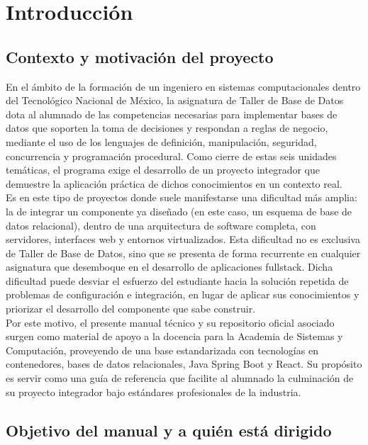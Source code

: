 \chapter{Introducci\'on}
	\section{Contexto y motivaci\'on del proyecto}
	En el \'ambito de la formaci\'on de un ingeniero en sistemas computacionales dentro del Tecnol\'ogico Nacional de M\'exico, la asignatura de Taller de Base de Datos dota al alumnado de las competencias necesarias para implementar bases de datos que soporten la toma de decisiones y respondan a reglas de negocio, mediante el uso de los lenguajes de definici\'on, manipulaci\'on, seguridad, concurrencia y programaci\'on procedural. Como cierre de estas seis unidades tem\'aticas, el programa exige el desarrollo de un proyecto integrador que demuestre la aplicaci\'on pr\'actica de dichos conocimientos en un contexto real. \\
	
	Es en este tipo de proyectos donde suele manifestarse una dificultad m\'as amplia: la de integrar un componente ya diseñado (en este caso, un esquema de base de datos relacional), dentro de una arquitectura de software completa, con servidores, interfaces web y entornos virtualizados. Esta dificultad no es exclusiva de Taller de Base de Datos, sino que se presenta de forma recurrente en cualquier asignatura que desemboque en el desarrollo de aplicaciones fullstack. Dicha dificultad puede desviar el esfuerzo del estudiante hacia la soluci\'on repetida de problemas de configuraci\'on e integraci\'on, en lugar de aplicar sus conocimientos y priorizar el desarrollo del componente que sabe construir. \\
	
	Por este motivo, el presente manual t\'ecnico y su repositorio oficial asociado surgen como material de apoyo a la docencia para la Academia de Sistemas y Computaci\'on, proveyendo de una base estandarizada con tecnolog\'ias en contenedores, bases de datos relacionales, Java Spring Boot y React. Su prop\'osito es servir como una gu\'ia de referencia que facilite al alumnado la culminaci\'on de su proyecto integrador bajo est\'andares profesionales de la industria.
	
	\section{Objetivo del manual y a qui\'en est\'a dirigido}
	
